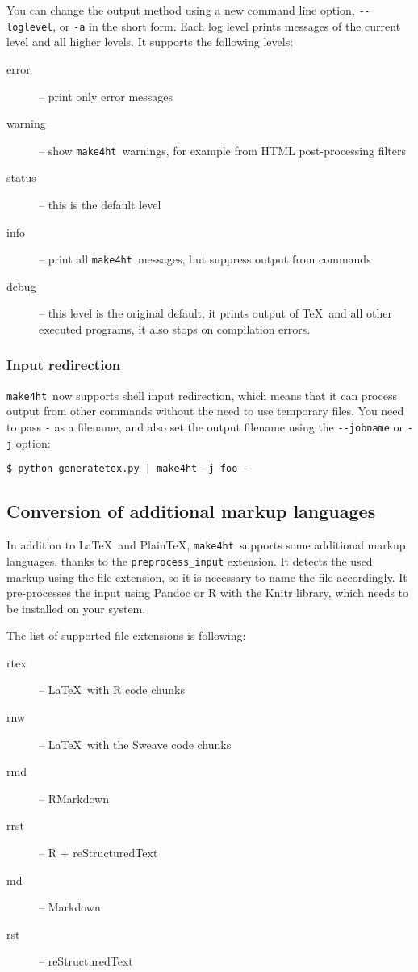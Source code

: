 \documentclass{ltugboat}
\newcommand\makefourht{\texttt{make4ht}}
\begin{document}
You can change the output method using a new command line option,
\verb|--loglevel|, or \verb|-a| in the short form. Each log level prints 
messages of the current level and all higher levels.
It supports the following levels:

\begin{description}
  \item[error] -- print only error messages
  \item[warning] -- show \makefourht\ warnings, for example from HTML post-processing filters
  \item[status] -- this is the default level 
  \item[info]  -- print all \makefourht\ messages, but suppress output from commands
  \item[debug] -- this level is the original default, it prints output of
    \TeX\ and all other executed programs, it also stops on compilation
    errors.
\end{description}

\subsubsection{Input redirection}

\makefourht\ now supports shell input redirection, which means that it can 
process output from other commands without the need to use temporary files.
You need to pass \verb|-| as a filename, and also set the output filename using
the \verb|--jobname| or \verb|-j| option:

\begin{verbatim}
$ python generatetex.py | make4ht -j foo -
\end{verbatim}



\subsection{Conversion of additional markup languages}

In addition to \LaTeX\ and Plain\TeX, \makefourht\ supports some additional
markup languages, thanks to the \verb|preprocess_input| extension. 
It detects the used markup using the file extension, so it is necessary
to name the file accordingly. It pre-processes the input using Pandoc or R with
the Knitr library, which needs to be installed on your system.

The list of supported file extensions is following:

\begin{description}
  \item[rtex] -- \LaTeX\ with R code chunks
  \item[rnw] -- \LaTeX\ with the Sweave code chunks
  \item[rmd] -- RMarkdown
  \item[rrst] -- R + reStructuredText
  \item[md] -- Markdown
  \item[rst] -- reStructuredText
\end{description}
\end{document}
